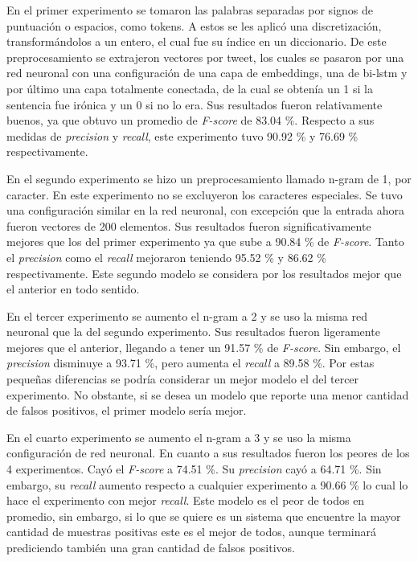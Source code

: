 \par En el primer experimento se tomaron las palabras separadas por signos de puntuación o espacios, como tokens. A estos se les aplicó una discretización, transformándolos a un entero, el cual fue su índice en un diccionario. De este preprocesamiento se extrajeron vectores por tweet, los cuales se pasaron por una red neuronal con una configuración de una capa de embeddings, una de \gls{bi-lstm} y por último una capa totalmente conectada, de la cual se obtenía un 1 si la sentencia fue irónica y un 0 si no lo era. Sus resultados fueron relativamente buenos, ya que obtuvo un promedio de \textit{F-score} de 83.04 \%. Respecto a sus medidas de \textit{precision} y \textit{recall}, este experimento tuvo 90.92 \% y 76.69 \% respectivamente.

\par En el segundo experimento se hizo un preprocesamiento llamado n-gram de 1, por caracter. En este experimento no se excluyeron los caracteres especiales. Se tuvo una configuración similar en la red neuronal, con excepción que la entrada ahora fueron vectores de 200 elementos. Sus resultados fueron significativamente mejores que los del primer experimento ya que sube a 90.84 \% de \textit{F-score}. Tanto el \textit{precision} como el \textit{recall} mejoraron teniendo 95.52 \% y 86.62 \% respectivamente. Este segundo modelo se considera por los resultados mejor que el anterior en todo sentido.

\par En el tercer experimento se aumento el n-gram a 2 y se uso la misma red neuronal que la del segundo experimento. Sus resultados fueron ligeramente mejores que el anterior, llegando a tener un 91.57 \% de \textit{F-score}. Sin embargo, el \textit{precision}
disminuye a 93.71 \%, pero aumenta el \textit{recall} a 89.58 \%. Por estas pequeñas diferencias se podría considerar un mejor modelo el del tercer experimento. No obstante, si se desea un modelo que reporte una menor cantidad de falsos positivos, el primer modelo sería mejor.

\par En el cuarto experimento se aumento el n-gram a 3 y se uso la misma configuración de red neuronal. En cuanto a sus resultados fueron los peores de los 4 experimentos. Cayó el \textit{F-score} a 74.51 \%. Su \textit{precision} cayó a 64.71 \%. Sin embargo, su \textit{recall} aumento respecto a cualquier experimento a 90.66 \% lo cual lo hace el experimento con mejor \textit{recall}. Este modelo es el peor de todos en promedio, sin embargo, si lo que se quiere es un sistema que encuentre la mayor cantidad de muestras positivas este es el mejor de todos, aunque terminará prediciendo también una gran cantidad de falsos positivos.

